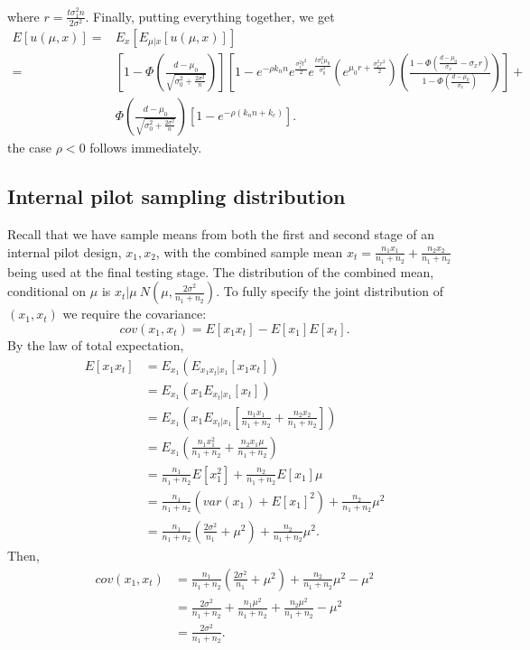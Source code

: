 \documentclass[sagev]{sagej}
\begin{document}
where $r = \frac{t \sigma_1^2 n}{2\sigma^2}$. Finally, putting everything together, we get
\begin{align*}
E[u(\mu, x)] =& E_x\left[ E_{\mu | x} [u(\mu, x)] \right] \\
 =& \left[ 1- \Phi\left(\frac{d-\mu_0}{\sqrt{\sigma_0^2 + \frac{2\sigma^2}{n}}} \right)  \right] \left[ 1 - e^{-\rho k_n n} e^{\frac{\sigma_1^2 t^2}{2}} e^{\frac{t\sigma_1^2 \mu_0}{\sigma_0^2}} \left( e^{\mu_0 r + \frac{\sigma_x^2 r^2}{2} } \right) \left(\frac{1 - \Phi(\frac{d-\mu_0}{\sigma_x} - \sigma_x r)}{1 - \Phi(\frac{d-\mu_0}{\sigma_x})} \right)  \right] + \\
 & \Phi\left(\frac{d-\mu_0}{\sqrt{\sigma_0^2 + \frac{2\sigma^2}{n}}} \right) \left[1 - e^{-\rho(k_n n + k_c)}\right].
\end{align*}
the case $\rho < 0$ follows immediately.

\subsection*{Internal pilot sampling distribution}

Recall that we have sample means from both the first and second stage of an internal pilot design, $x_1, x_2$, with the combined sample mean $x_t = \frac{n_1 x_1}{n_1 + n_2} + \frac{n_2 x_2}{n_1 + n_2}$ being used at the final testing stage. The distribution of the combined mean, conditional on $\mu$ is $x_t | \mu ~ N\left( \mu, \frac{2\sigma^2}{n_1 + n_2} \right)$. To fully specify the joint distribution of $(x_1, x_t)$ we require the covariance:
$$
cov(x_1, x_t) = E[x_1 x_t] - E[x_1] E[x_t].
$$
By the law of total expectation,
\begin{align*}
E[x_1 x_t] &= E_{x_1} ( E_{x_1 x_t | x_1}[x_1 x_t] ) \\
&= E_{x_1} ( x_1 E_{x_t | x_1}[x_t] ) \\
&= E_{x_1} \left( x_1 E_{x_t | x_1}\left[\frac{n_1 x_1}{n_1 + n_2} + \frac{n_2 x_2}{n_1 + n_2}\right] \right) \\
&= E_{x_1} \left( \frac{n_1 x_1^2}{n_1 + n_2} + \frac{n_2 x_1 \mu}{n_1 + n_2} \right) \\
&= \frac{n_1}{n_1 + n_2} E[x_1^2] + \frac{n_2}{n_1 + n_2} E[x_1] \mu \\
&= \frac{n_1}{n_1 + n_2} (var(x_1) + E[x_1]^2) + \frac{n_2}{n_1 + n_2} \mu^2 \\
&= \frac{n_1}{n_1 + n_2} \left(\frac{2\sigma^2}{n_1} + \mu^2\right) + \frac{n_2}{n_1 + n_2} \mu^2.
\end{align*}
Then,
\begin{align*}
cov(x_1, x_t) &= \frac{n_1}{n_1 + n_2} \left(\frac{2\sigma^2}{n_1} + \mu^2\right) + \frac{n_2}{n_1 + n_2} \mu^2 - \mu^2 \\
&= \frac{2\sigma^2}{n_1 + n_2} + \frac{n_1 \mu^2}{n_1 + n_2} + \frac{n_2 \mu^2}{n_1 + n_2} - \mu^2 \\
&= \frac{2\sigma^2}{n_1 + n_2} .
\end{align*}
\end{document}
